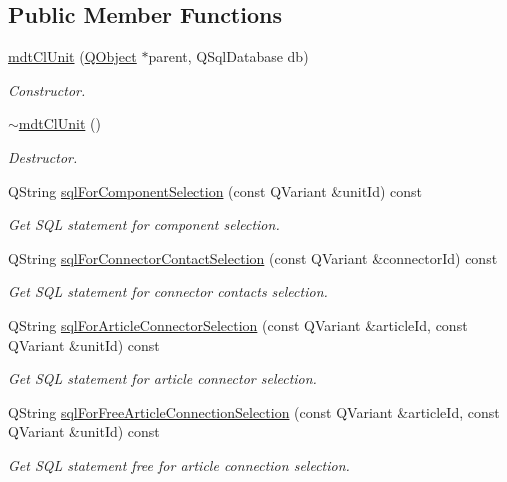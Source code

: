 \subsection*{Public Member Functions}
\begin{DoxyCompactItemize}
\item 
\hyperlink{classmdt_cl_unit_a8aa2f0ab9aa2e5542dc97d51cf21b15c}{mdt\-Cl\-Unit} (\hyperlink{class_q_object}{Q\-Object} $\ast$parent, Q\-Sql\-Database db)
\begin{DoxyCompactList}\small\item\em Constructor. \end{DoxyCompactList}\item 
\hyperlink{classmdt_cl_unit_a1eb2f9f1f96974b424c5f27d178e59c1}{$\sim$mdt\-Cl\-Unit} ()
\begin{DoxyCompactList}\small\item\em Destructor. \end{DoxyCompactList}\item 
Q\-String \hyperlink{classmdt_cl_unit_ab2c695848d375d4a475756106bb1558c}{sql\-For\-Component\-Selection} (const Q\-Variant \&unit\-Id) const 
\begin{DoxyCompactList}\small\item\em Get S\-Q\-L statement for component selection. \end{DoxyCompactList}\item 
Q\-String \hyperlink{classmdt_cl_unit_a02c7a25bbe2dbc849410a9ab2861f559}{sql\-For\-Connector\-Contact\-Selection} (const Q\-Variant \&connector\-Id) const 
\begin{DoxyCompactList}\small\item\em Get S\-Q\-L statement for connector contacts selection. \end{DoxyCompactList}\item 
Q\-String \hyperlink{classmdt_cl_unit_af3d59cb540d48903916b2397bff16d4b}{sql\-For\-Article\-Connector\-Selection} (const Q\-Variant \&article\-Id, const Q\-Variant \&unit\-Id) const 
\begin{DoxyCompactList}\small\item\em Get S\-Q\-L statement for article connector selection. \end{DoxyCompactList}\item 
Q\-String \hyperlink{classmdt_cl_unit_a1d19734ccf1bd4d3d86b9cfd5a8307ad}{sql\-For\-Free\-Article\-Connection\-Selection} (const Q\-Variant \&article\-Id, const Q\-Variant \&unit\-Id) const 
\begin{DoxyCompactList}\small\item\em Get S\-Q\-L statement free for article connection selection. \end{DoxyCompactList}\item 

\end{DoxyCompactItemize}
